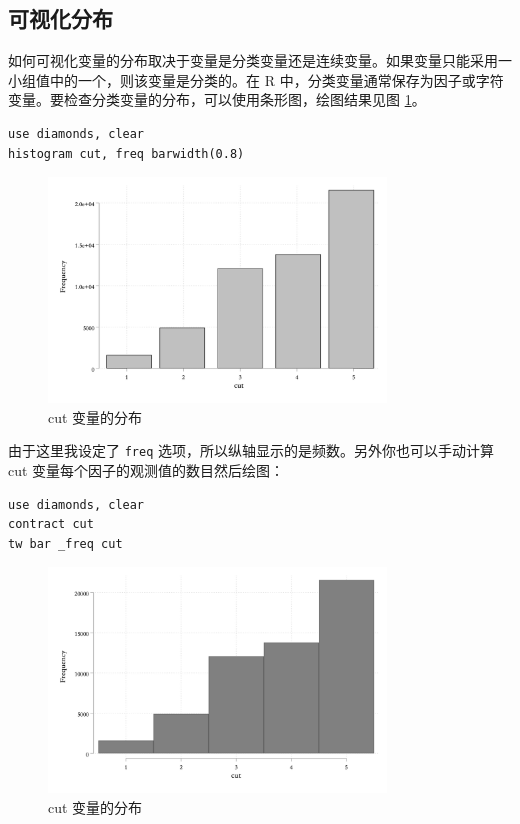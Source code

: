\documentclass[]{ctexbook}
\begin{document}
\hypertarget{section-59}{%
\subsection{可视化分布}\label{section-59}}

如何可视化变量的分布取决于变量是分类变量还是连续变量。如果变量只能采用一小组值中的一个，则该变量是分类的。在 R 中，分类变量通常保存为因子或字符变量。要检查分类变量的分布，可以使用条形图，绘图结果见图 \ref{fig:histogramcut}。

\begin{lstlisting}
use diamonds, clear
histogram cut, freq barwidth(0.8)
\end{lstlisting}

\begin{figure}

{\centering \includegraphics[width=0.8\textwidth]{assets/histogramcut} 

}

\caption{cut 变量的分布}\label{fig:histogramcut}
\end{figure}

由于这里我设定了 \texttt{freq} 选项，所以纵轴显示的是频数。另外你也可以手动计算 cut 变量每个因子的观测值的数目然后绘图：

\begin{lstlisting}
use diamonds, clear
contract cut
tw bar _freq cut
\end{lstlisting}

\begin{figure}

{\centering \includegraphics[width=0.8\textwidth]{assets/histogramcut2} 

}

\caption{cut 变量的分布}\label{fig:histogramcut2}
\end{figure}
\end{document}
